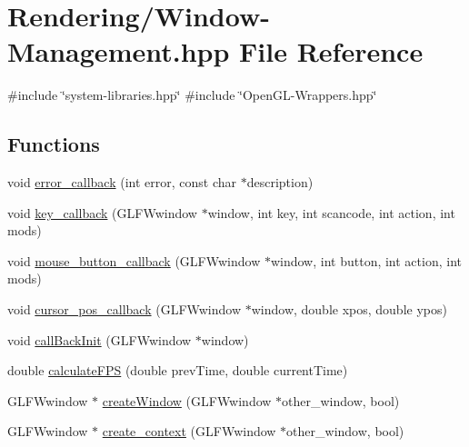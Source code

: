 \hypertarget{Window-Management_8hpp}{}\section{Rendering/\+Window-\/\+Management.hpp File Reference}
\label{Window-Management_8hpp}
{\ttfamily \#include \char`\"{}system-\/libraries.\+hpp\char`\"{}}\newline
{\ttfamily \#include \char`\"{}Open\+G\+L-\/\+Wrappers.\+hpp\char`\"{}}\newline
\subsection*{Functions}
\begin{DoxyCompactItemize}
\item 
void \mbox{\hyperlink{Window-Management_8hpp_a4ee391c8bab624943c822faafb2c320e}{error\+\_\+callback}} (int error, const char $\ast$description)
\item 
void \mbox{\hyperlink{Window-Management_8hpp_a286930f4e8ede059b83ff6eafa2ff718}{key\+\_\+callback}} (G\+L\+F\+Wwindow $\ast$window, int key, int scancode, int action, int mods)
\item 
void \mbox{\hyperlink{Window-Management_8hpp_a5515d805e76ce6728de3c0dc5e187c86}{mouse\+\_\+button\+\_\+callback}} (G\+L\+F\+Wwindow $\ast$window, int button, int action, int mods)
\item 
void \mbox{\hyperlink{Window-Management_8hpp_ab9a970cff09c5a4031b814242706b4f6}{cursor\+\_\+pos\+\_\+callback}} (G\+L\+F\+Wwindow $\ast$window, double xpos, double ypos)
\item 
void \mbox{\hyperlink{Window-Management_8hpp_a49a5ff4f2fc2d79e62443424b32433ec}{call\+Back\+Init}} (G\+L\+F\+Wwindow $\ast$window)
\item 
double \mbox{\hyperlink{Window-Management_8hpp_aa684abe4ed14277927421e1926ab67eb}{calculate\+F\+PS}} (double prev\+Time, double current\+Time)
\item 
G\+L\+F\+Wwindow $\ast$ \mbox{\hyperlink{Window-Management_8hpp_a9877855b1f20b67790eeace6c28ec048}{create\+Window}} (G\+L\+F\+Wwindow $\ast$other\+\_\+window, bool)
\item 
G\+L\+F\+Wwindow $\ast$ \mbox{\hyperlink{Window-Management_8hpp_a556d3732df6c5c8329942c50599a0f0f}{create\+\_\+context}} (G\+L\+F\+Wwindow $\ast$other\+\_\+window, bool)
\end{DoxyCompactItemize}


